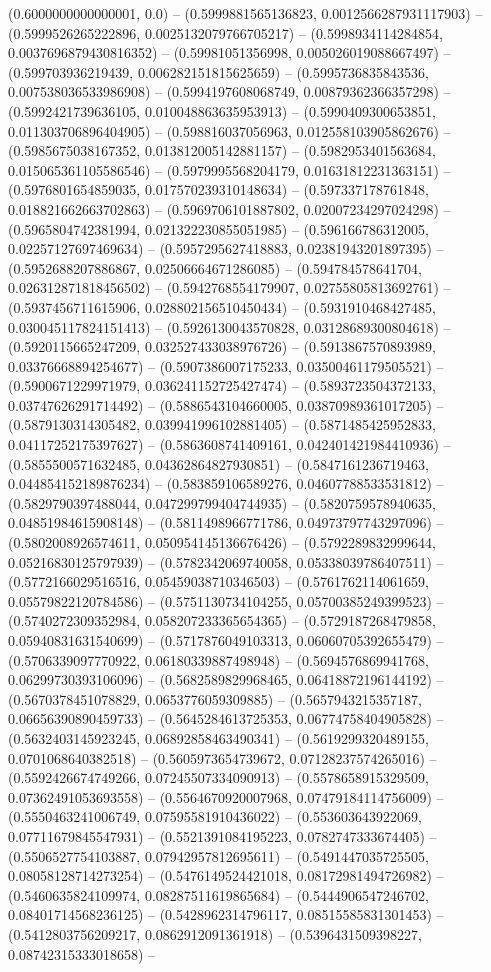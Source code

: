  (0.6000000000000001, 0.0) -- (0.5999881565136823, 0.0012566287931117903) -- (0.5999526265222896, 0.0025132079766705217) -- (0.5998934114284854, 0.0037696879430816352) -- (0.59981051356998, 0.005026019088667497) -- (0.599703936219439, 0.006282151815625659) -- (0.5995736835843536, 0.007538036533986908) -- (0.5994197608068749, 0.00879362366357298) -- (0.5992421739636105, 0.010048863635953913) -- (0.5990409300653851, 0.011303706896404905) -- (0.598816037056963, 0.012558103905862676) -- (0.5985675038167352, 0.013812005142881157) -- (0.5982953401563684, 0.015065361105586546) -- (0.5979995568204179, 0.01631812231363151) -- (0.5976801654859035, 0.017570239310148634) -- (0.597337178761848, 0.018821662663702863) -- (0.5969706101887802, 0.02007234297024298) -- (0.5965804742381994, 0.021322230855051985) -- (0.596166786312005, 0.02257127697469634) -- (0.5957295627418883, 0.02381943201897395) -- (0.5952688207886867, 0.02506664671286085) -- (0.594784578641704, 0.026312871818456502) -- (0.5942768554179907, 0.02755805813692761) -- (0.5937456711615906, 0.028802156510450434) -- (0.5931910468427485, 0.030045117824151413) -- (0.5926130043570828, 0.03128689300804618) -- (0.5920115665247209, 0.032527433038976726) -- (0.5913867570893989, 0.03376668894254677) -- (0.5907386007175233, 0.03500461179505521) -- (0.5900671229971979, 0.036241152725427474) -- (0.5893723504372133, 0.03747626291714492) -- (0.5886543104660005, 0.03870989361017205) -- (0.5879130314305482, 0.039941996102881405) -- (0.5871485425952833, 0.04117252175397627) -- (0.5863608741409161, 0.042401421984410936) -- (0.5855500571632485, 0.04362864827930851) -- (0.5847161236719463, 0.044854152189876234) -- (0.583859106589276, 0.04607788533531812) -- (0.5829790397488044, 0.047299799404744935) -- (0.5820759578940635, 0.04851984615908148) -- (0.5811498966771786, 0.04973797743297096) -- (0.5802008926574611, 0.050954145136676426) -- (0.5792289832999644, 0.05216830125797939) -- (0.5782342069740058, 0.05338039786407511) -- (0.5772166029516516, 0.05459038710346503) -- (0.5761762114061659, 0.05579822120784586) -- (0.5751130734104255, 0.05700385249399523) -- (0.5740272309352984, 0.058207233365654365) -- (0.5729187268479858, 0.05940831631540699) -- (0.5717876049103313, 0.06060705392655479) -- (0.5706339097770922, 0.06180339887498948) -- (0.5694576869941768, 0.06299730393106096) -- (0.5682589829968465, 0.06418872196144192) -- (0.5670378451078829, 0.0653776059309885) -- (0.5657943215357187, 0.06656390890459733) -- (0.5645284613725353, 0.06774758404905828) -- (0.5632403145923245, 0.06892858463490341) -- (0.5619299320489155, 0.0701068640382518) -- (0.5605973654739672, 0.07128237574265016) -- (0.5592426674749266, 0.07245507334090913) -- (0.5578658915329509, 0.07362491053693558) -- (0.5564670920007968, 0.07479184114756009) -- (0.5550463241006749, 0.07595581910436022) -- (0.553603643922069, 0.07711679845547931) -- (0.5521391084195223, 0.0782747333674405) -- (0.5506527754103887, 0.07942957812695611) -- (0.5491447035725505, 0.08058128714273254) -- (0.5476149524421018, 0.08172981494726982) -- (0.5460635824109974, 0.08287511619865684) -- (0.5444906547246702, 0.08401714568236125) -- (0.5428962314796117, 0.08515585831301453) -- (0.5412803756209217, 0.0862912091361918) -- (0.5396431509398227, 0.08742315333018658) -- 